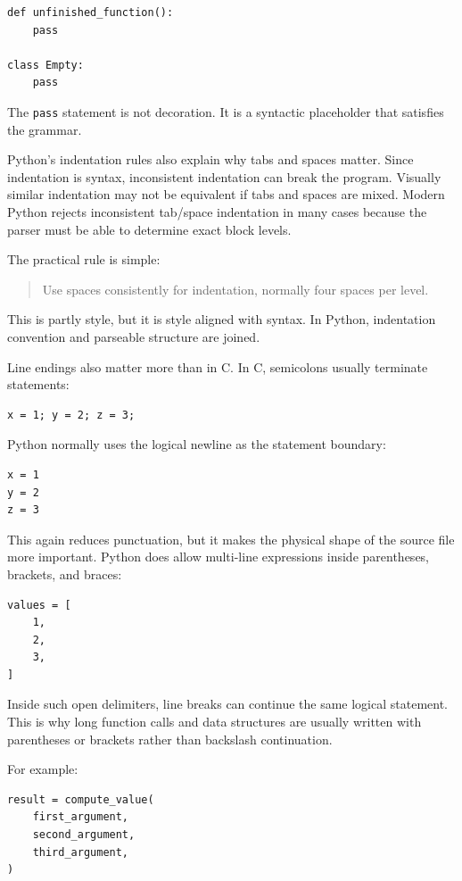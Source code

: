 \begin{verbatim}
def unfinished_function():
    pass

class Empty:
    pass
\end{verbatim}

The \texttt{pass} statement is not decoration. It is a syntactic placeholder that satisfies the grammar.

Python's indentation rules also explain why tabs and spaces matter. Since indentation is syntax, inconsistent indentation can break the program. Visually similar indentation may not be equivalent if tabs and spaces are mixed. Modern Python rejects inconsistent tab/space indentation in many cases because the parser must be able to determine exact block levels.

The practical rule is simple:

\begin{quote}
Use spaces consistently for indentation, normally four spaces per level.
\end{quote}

This is partly style, but it is style aligned with syntax. In Python, indentation convention and parseable structure are joined.

Line endings also matter more than in C. In C, semicolons usually terminate statements:

\begin{verbatim}
x = 1; y = 2; z = 3;
\end{verbatim}

Python normally uses the logical newline as the statement boundary:

\begin{verbatim}
x = 1
y = 2
z = 3
\end{verbatim}

This again reduces punctuation, but it makes the physical shape of the source file more important. Python does allow multi-line expressions inside parentheses, brackets, and braces:

\begin{verbatim}
values = [
    1,
    2,
    3,
]
\end{verbatim}

Inside such open delimiters, line breaks can continue the same logical statement. This is why long function calls and data structures are usually written with parentheses or brackets rather than backslash continuation.

For example:

\begin{verbatim}
result = compute_value(
    first_argument,
    second_argument,
    third_argument,
)
\end{verbatim}

